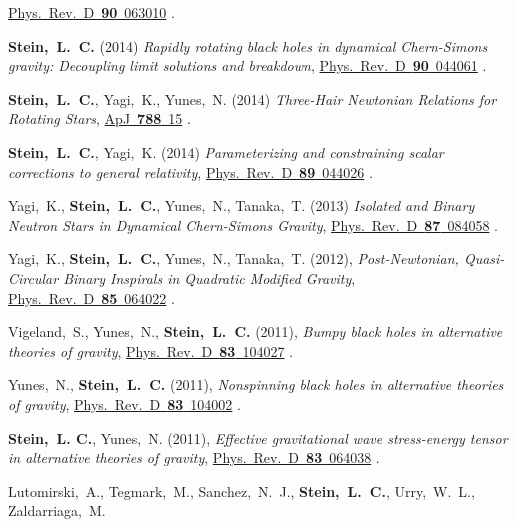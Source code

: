 \begin{etaremune}[start=\value{pubCounter}]
  \href{http://dx.doi.org/10.1103/PhysRevD.90.063010}{Phys.~Rev.~D~{\bf 90}~063010}
  .
\item
  {\bf Stein,~L.~C.}
  (2014)
  {\it Rapidly rotating black holes in dynamical Chern-Simons gravity:
    Decoupling limit solutions and breakdown},
  \href{http://dx.doi.org/10.1103/PhysRevD.90.044061}{Phys.~Rev.~D~{\bf 90}~044061}
  .
\item
  {\bf Stein,~L.~C.}, Yagi,~K., Yunes,~N.
  (2014)
  {\it Three-Hair Newtonian Relations for Rotating Stars},
  \href{http://dx.doi.org/10.1088/0004-637X/788/1/15}{ApJ~{\bf 788}~15}
  .
\item
  {\bf Stein,~L.~C.}, Yagi,~K.
  (2014)
  {\it Parameterizing and constraining scalar corrections to general relativity},
  \href{http://dx.doi.org/10.1103/PhysRevD.89.044026}{Phys.~Rev.~D~{\bf 89}~044026}
  .
\item
  Yagi,~K., {\bf Stein,~L.~C.}, Yunes,~N., Tanaka,~T.
  (2013)
  {\it Isolated and Binary Neutron Stars in Dynamical Chern-Simons Gravity},
  \href{http://dx.doi.org/10.1103/PhysRevD.87.084058}{Phys.~Rev.~D~{\bf 87}~084058}
  .
\item
  Yagi,~K., {\bf Stein,~L.~C.}, Yunes,~N., Tanaka,~T.
  (2012),
  {\it Post-Newtonian, Quasi-Circular Binary Inspirals in Quadratic Modified Gravity},
  \href{http://dx.doi.org/10.1103/PhysRevD.85.064022}{Phys.~Rev.~D~{\bf 85}~064022}
  .
\item
  Vigeland,~S., Yunes,~N., {\bf Stein,~L.~C.}
  (2011),
  {\it Bumpy black holes in alternative theories of gravity},
  \href{http://dx.doi.org/10.1103/PhysRevD.83.104027}{Phys.~Rev.~D~{\bf 83}~104027}
  .
\item
  Yunes,~N., {\bf Stein,~L.~C.}
  (2011),
  {\it Nonspinning black holes in alternative theories of gravity},
  \href{http://dx.doi.org/10.1103/PhysRevD.83.104002}{Phys.~Rev.~D~{\bf 83}~104002}
  .
\item
  {\bf Stein,~L. C.}, Yunes,~N.
  (2011),
  {\it Effective gravitational wave stress-energy tensor in
    alternative theories of gravity},
  \href{http://dx.doi.org/10.1103/PhysRevD.83.064038}{Phys.~Rev.~D~{\bf 83}~064038}
  .
\item
  Lutomirski,~A., Tegmark,~M., Sanchez,~N.~J., {\bf
    Stein,~L.~C.}, Urry,~W.~L., Zaldarriaga,~M.

\end{etaremune}
